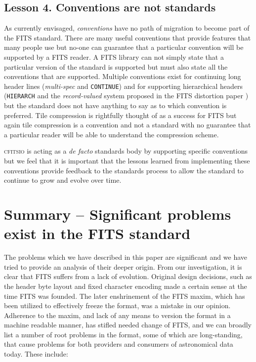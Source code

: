 \documentclass[final,authoryear,5p,times,twocolumn]{elsarticle}
\begin{document}
{{\subsection{Lesson 4. Conventions are not standards}
As currently envisaged, \emph{conventions} have no path of migration
to become part of the FITS standard. There are many useful conventions
that provide features that many people use but no-one can guarantee
that a particular convention will be supported by a FITS reader. A
FITS library can not simply state that a particular version of the
standard is supported but must also state all the conventions that are
supported. Multiple conventions exist for
continuing long header lines (\emph{multi-spec} and \texttt{CONTINUE})
and for supporting hierarchical headers (\texttt{HIERARCH} and
the \emph{record-valued} system proposed in the FITS
distortion paper \citep{FITSDistort}) but the standard does not have anything to say
as to which convention is preferred. Tile compression is rightfully
thought of as a success for FITS but again tile compression is a
convention and not a standard with no guarantee that a particular
reader will be able to understand the compression scheme.

\textsc{cfitsio} is acting as a \emph{de facto} standards body by
supporting specific conventions but we feel that it is important that
the lessons learned from implementing these conventions provide
feedback to the standards process to allow the standard to continue to
grow and evolve over time.

\section{Summary -- Significant problems exist in the FITS standard}


The problems which we have described in this paper are significant
and we have tried to provide an analysis of their deeper origin.
From our investigation, it is clear that FITS suffers from a lack of 
evolution. Original design decisions, such as the header byte layout
and fixed character encoding made a certain sense at the time FITS 
was founded. The later enshrinement of the FITS maxim, which has
been utilized to effectively freeze the format, was a mistake in our 
opinion.  Adherence to the maxim, and lack of any means to version
the format in a machine readable manner, has stifled needed change of
FITS, and we can broadly list a number of root problems in the format, 
some of which are long-standing, that cause problems for both providers
and consumers of astronomical data today.  These include:

}}
\end{document}
